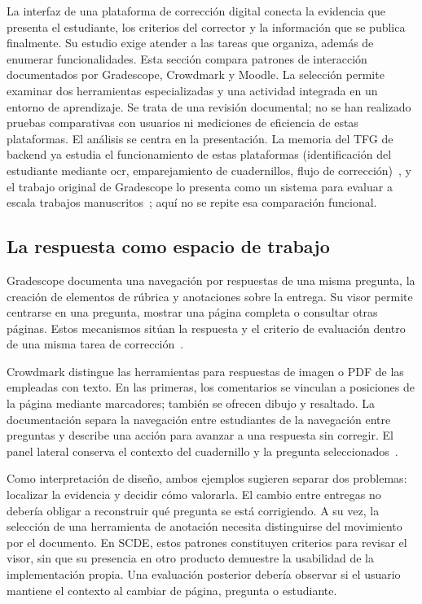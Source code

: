 La interfaz de una plataforma de corrección digital conecta la evidencia que
presenta el estudiante, los criterios del corrector y la información que se
publica finalmente. Su estudio exige atender a las tareas que organiza, además
de enumerar funcionalidades. Esta sección compara patrones de interacción
documentados por Gradescope, Crowdmark y Moodle. La selección permite examinar
dos herramientas especializadas y una actividad integrada en un entorno de
aprendizaje. Se trata de una revisión documental; no se han realizado pruebas
comparativas con usuarios ni mediciones de eficiencia de estas plataformas.
El análisis se centra en la presentación. La memoria del TFG de backend ya
estudia el funcionamiento de estas plataformas (identificación del estudiante
mediante \acs{ocr}, emparejamiento de cuadernillos, flujo de
corrección)~\cite{scdee_backend_repo}, y el trabajo original de Gradescope
lo presenta como un sistema para evaluar a escala trabajos
manuscritos~\cite{singh2017gradescope}; aquí no se repite esa comparación
funcional.

\subsection{La respuesta como espacio de trabajo}

Gradescope documenta una navegación por respuestas de una misma pregunta, la
creación de elementos de rúbrica y anotaciones sobre la entrega. Su visor permite
centrarse en una pregunta, mostrar una página completa o consultar otras páginas.
Estos mecanismos sitúan la respuesta y el criterio de evaluación dentro de una
misma tarea de corrección~\cite{codex_gradescope_ui}.

Crowdmark distingue las herramientas para respuestas de imagen o PDF de las
empleadas con texto. En las primeras, los comentarios se vinculan a posiciones
de la página mediante marcadores; también se ofrecen dibujo y resaltado.
La documentación separa la navegación entre estudiantes de la navegación entre
preguntas y describe una acción para avanzar a una respuesta sin corregir.
El panel lateral conserva el contexto del cuadernillo y la pregunta
seleccionados~\cite{codex_crowdmark_navigation}.

Como interpretación de diseño, ambos ejemplos sugieren separar dos problemas:
localizar la evidencia y decidir cómo valorarla. El cambio entre entregas no
debería obligar a reconstruir qué pregunta se está corrigiendo. A su vez, la
selección de una herramienta de anotación necesita distinguirse del movimiento
por el documento. En SCDE, estos patrones constituyen criterios para revisar el
visor, sin que su presencia en otro producto demuestre la usabilidad de la
implementación propia. Una evaluación posterior debería observar si el usuario
mantiene el contexto al cambiar de página, pregunta o estudiante.

